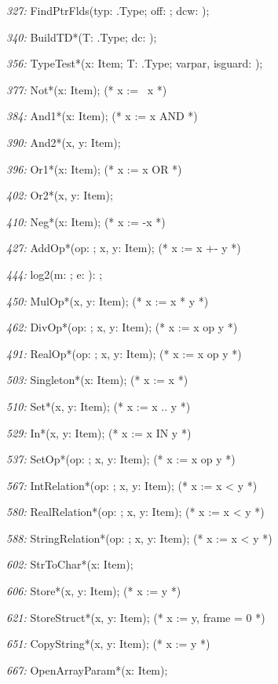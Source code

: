 \item{\it 327:} FindPtrFlds(typ: \ORB.Type; off: \LONGINT; \VAR dcw: \LONGINT);
\item{\it 340:} BuildTD*(T: \ORB.Type; \VAR dc: \LONGINT);
\item{\it 356:} TypeTest*(\VAR x: Item; T: \ORB.Type; varpar, isguard: \BOOLEAN);
\item{\it 377:} Not*(\VAR x: Item);   (* x := ~x *)
\item{\it 384:} And1*(\VAR x: Item);   (* x := x AND *)
\item{\it 390:} And2*(\VAR x, y: Item);
\item{\it 396:} Or1*(\VAR x: Item);   (* x := x OR *)
\item{\it 402:} Or2*(\VAR x, y: Item);
\item{\it 410:} Neg*(\VAR x: Item);   (* x := -x *)
\item{\it 427:} AddOp*(op: \LONGINT; \VAR x, y: Item);   (* x := x +- y *)
\item{\it 444:} log2(m: \LONGINT; \VAR e: \LONGINT): \LONGINT;
\item{\it 450:} MulOp*(\VAR x, y: Item);   (* x := x * y *)
\item{\it 462:} DivOp*(op: \LONGINT; \VAR x, y: Item);   (* x := x op y *)
\item{\it 491:} RealOp*(op: \INTEGER; \VAR x, y: Item);   (* x := x op y *)
\item{\it 503:} Singleton*(\VAR x: Item);  (* x := {x} *)
\item{\it 510:} Set*(\VAR x, y: Item);   (* x := {x .. y} *)
\item{\it 529:} In*(\VAR x, y: Item);  (* x := x IN y *)
\item{\it 537:} SetOp*(op: \LONGINT; \VAR x, y: Item);   (* x := x op y *)
\item{\it 567:} IntRelation*(op: \INTEGER; \VAR x, y: Item);   (* x := x < y *)
\item{\it 580:} RealRelation*(op: \INTEGER; \VAR x, y: Item);   (* x := x < y *)
\item{\it 588:} StringRelation*(op: \INTEGER; \VAR x, y: Item);   (* x := x < y *)
\item{\it 602:} StrToChar*(\VAR x: Item);
\item{\it 606:} Store*(\VAR x, y: Item); (* x := y *)
\item{\it 621:} StoreStruct*(\VAR x, y: Item); (* x := y, frame = 0 *)
\item{\it 651:} CopyString*(\VAR x, y: Item);  (* x := y *) 
\item{\it 667:} OpenArrayParam*(\VAR x: Item);
